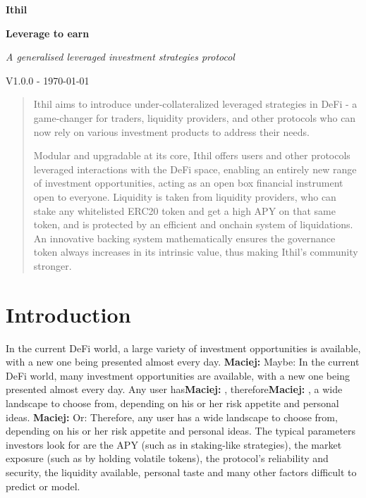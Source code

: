 \documentclass[a4paper,10 pt]{article}
\newcommand{\mz}[1]{\noindent \textcolor{NavyBlue}{\textbf{Maciej:}  #1}}
\theoremstyle{definition}
\begin{document}
\begin{titlepage}
    \begin{center}
        \vspace*{1cm}
            
        \Huge
        \textbf{Ithil}

        \vspace{0.5cm}
        \Large
        {\bf Leverage to earn}

        \vspace{1cm}
        \Large
        {\it A generalised leveraged investment strategies protocol}

        \vspace{1.5cm}
        {\normalsize V1.0.0 - \today}
        \vspace{1.0cm}

        \begin{abstract}        
        Ithil aims to introduce under-collateralized leveraged strategies in DeFi - a game-changer for traders, liquidity providers, and other protocols who can now rely on various investment products to address their needs. 
        
        Modular and upgradable at its core, Ithil offers users and other protocols leveraged interactions with the DeFi space, enabling an entirely new range of investment opportunities, acting as an open box financial instrument open to everyone. Liquidity is taken from liquidity providers, who can stake any whitelisted ERC20 token and get a high APY on that same token, and is protected by an efficient and onchain system of liquidations. An innovative backing system mathematically ensures the governance token always increases in its intrinsic value, thus making Ithil's community stronger.
        \end{abstract}
            
    \end{center}
\tableofcontents
\end{titlepage}

\section{Introduction}

In the current DeFi world, a large variety of investment opportunities is available, with a new one being presented almost every day. \mz{Maybe: In the current DeFi world, many investment opportunities are available, with a new one being presented almost every day.} Any user has\mz{,} therefore\mz{,} a wide landscape to choose from, depending on his or her risk appetite and personal ideas. \mz{Or: Therefore, any user has a wide landscape to choose from, depending on his or her risk appetite and personal ideas.} The typical parameters investors look for are the APY (such as in staking-like strategies), the market exposure (such as by holding volatile tokens), the protocol's reliability and security, the liquidity available, personal taste and many other factors difficult to predict or model.
\end{document}
